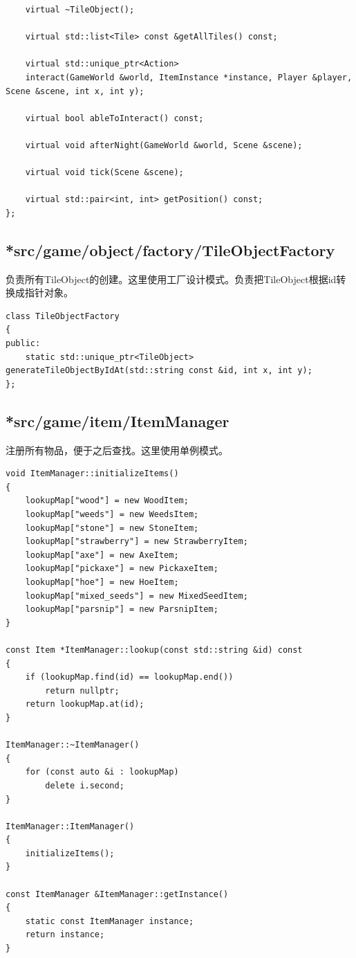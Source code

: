 \documentclass[a4paper,12pt]{report}
\begin{document}
\begin{spacing}{1.5}
\begin{lstlisting}
    virtual ~TileObject();

    virtual std::list<Tile> const &getAllTiles() const;

    virtual std::unique_ptr<Action>
    interact(GameWorld &world, ItemInstance *instance, Player &player, Scene &scene, int x, int y);

    virtual bool ableToInteract() const;

    virtual void afterNight(GameWorld &world, Scene &scene);

    virtual void tick(Scene &scene);

    virtual std::pair<int, int> getPosition() const;
};
\end{lstlisting}
\subsection{\textbf{*src/game/object/factory/TileObjectFactory}}
负责所有TileObject的创建。这里使用工厂设计模式。负责把TileObject根据id转换成指针对象。
\begin{lstlisting}
class TileObjectFactory
{
public:
    static std::unique_ptr<TileObject> generateTileObjectByIdAt(std::string const &id, int x, int y);
};
\end{lstlisting}
\subsection{\textbf{*src/game/item/ItemManager}}
注册所有物品，便于之后查找。这里使用单例模式。
\begin{lstlisting}
void ItemManager::initializeItems()
{
    lookupMap["wood"] = new WoodItem;
    lookupMap["weeds"] = new WeedsItem;
    lookupMap["stone"] = new StoneItem;
    lookupMap["strawberry"] = new StrawberryItem;
    lookupMap["axe"] = new AxeItem;
    lookupMap["pickaxe"] = new PickaxeItem;
    lookupMap["hoe"] = new HoeItem;
    lookupMap["mixed_seeds"] = new MixedSeedItem;
    lookupMap["parsnip"] = new ParsnipItem;
}

const Item *ItemManager::lookup(const std::string &id) const
{
    if (lookupMap.find(id) == lookupMap.end())
        return nullptr;
    return lookupMap.at(id);
}

ItemManager::~ItemManager()
{
    for (const auto &i : lookupMap)
        delete i.second;
}

ItemManager::ItemManager()
{
    initializeItems();
}

const ItemManager &ItemManager::getInstance()
{
    static const ItemManager instance;
    return instance;
}
\end{lstlisting}

\end{spacing}
\end{document}
